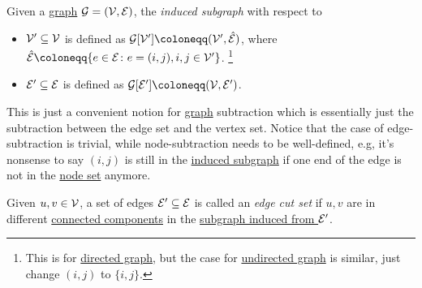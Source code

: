 \begin{definition}\label{def:induced-subgraph}
	Given a \hyperref[def:graph]{graph} \(\mathcal{\MakeUppercase{g}} = (\mathcal{\MakeUppercase{v}} , \mathcal{\MakeUppercase{e}} )\), the \emph{induced subgraph} with respect to
	\begin{itemize}
		\item \(\mathcal{\MakeUppercase{v}}^\prime \subseteq \mathcal{\MakeUppercase{v}} \) is defined as
		      \(\mathcal{\MakeUppercase{g}} [\mathcal{\MakeUppercase{v}} ^\prime ] \coloneqq (\mathcal{\MakeUppercase{v}} ^\prime, \hat{\mathcal{\MakeUppercase{e}}})\),
		      where \(\hat{\mathcal{\MakeUppercase{e}} }\coloneqq \{e\in \mathcal{\MakeUppercase{e}} \colon e = (i, j), i, j\in \mathcal{\MakeUppercase{v}} ^\prime\}\).
		      \footnote{This is for \hyperref[def:directed-graph]{directed graph}, but the case for \hyperref[def:undirected-graph]{undirected graph} is similar, just change \((i, j)\) to \(\{i, j\}\).}
		\item \(\mathcal{\MakeUppercase{e}}^\prime \subseteq \mathcal{\MakeUppercase{e}} \) is defined as
		      \(\mathcal{\MakeUppercase{g}} [\mathcal{\MakeUppercase{e}} ^\prime ] \coloneqq (\mathcal{\MakeUppercase{v}} , \mathcal{\MakeUppercase{e}}^\prime )\).
	\end{itemize}
\end{definition}

\begin{intuition}
	This is just a convenient notion for \hyperref[def:graph]{graph} subtraction which is essentially just the subtraction between the edge set and the vertex set.
	Notice that the case of edge-subtraction is trivial, while node-subtraction needs to be well-defined, e.g, it's nonsense to say \((i, j)\) is still in the
	\hyperref[def:induced-subgraph]{induced subgraph} if one end of the edge is not in the \hyperref[def:vertex-set]{node set} anymore.
\end{intuition}

\begin{definition}\label{def:edge-cut-set}
	Given \(u, v\in \mathcal{\MakeUppercase{v}} \), a set of edges \(\mathcal{\MakeUppercase{e}} ^\prime \subseteq \mathcal{\MakeUppercase{e}} \) is called an \emph{edge cut set}
	if \(u, v\) are in different \hyperref[def:connected]{connected components} in the \hyperref[def:induced-subgraph]{subgraph induced from \(\mathcal{\MakeUppercase{e}} ^\prime \)}.
\end{definition}

